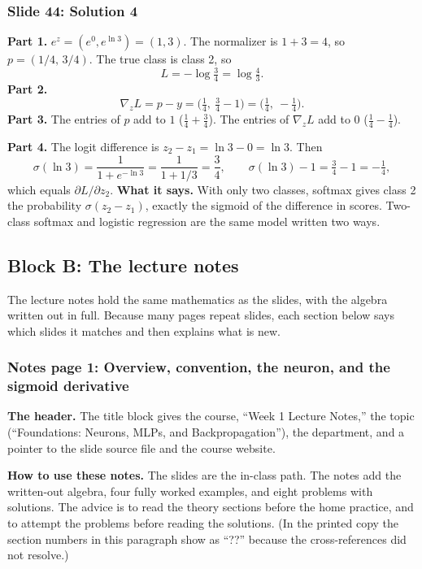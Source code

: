 \subsubsection{Slide 44: Solution 4}

\textbf{Part 1.} $e^{z}=(e^0,e^{\ln3})=(1,3)$. The normalizer is $1+3=4$, so $p=(1/4,\,3/4)$. The true class is class 2, so
\[
L=-\log\tfrac34=\log\tfrac43 .
\]
\textbf{Part 2.}
\[
\nabla_zL=p-y=\Big(\tfrac14,\ \tfrac34-1\Big)=\Big(\tfrac14,\ -\tfrac14\Big).
\]
\textbf{Part 3.} The entries of $p$ add to $1$ ($\tfrac14+\tfrac34$). The entries of $\nabla_zL$ add to $0$ ($\tfrac14-\tfrac14$).

\textbf{Part 4.} The logit difference is $z_2-z_1=\ln3-0=\ln3$. Then
\[
\sigma(\ln3)=\frac{1}{1+e^{-\ln3}}=\frac{1}{1+1/3}=\frac34, \qquad \sigma(\ln3)-1=\tfrac34-1=-\tfrac14 ,
\]
which equals $\partial L/\partial z_2$. \textbf{What it says.} With only two classes, softmax gives class 2 the probability $\sigma(z_2-z_1)$, exactly the sigmoid of the difference in scores. Two-class softmax and logistic regression are the same model written two ways.

\subsection{Block B: The lecture notes}

The lecture notes hold the same mathematics as the slides, with the algebra written out in full. Because many pages repeat slides, each section below says which slides it matches and then explains what is new.

\subsubsection{Notes page 1: Overview, convention, the neuron, and the sigmoid derivative}

\textbf{The header.} The title block gives the course, ``Week 1 Lecture Notes,'' the topic (``Foundations: Neurons, MLPs, and Backpropagation''), the department, and a pointer to the slide source file and the course website.

\textbf{How to use these notes.} The slides are the in-class path. The notes add the written-out algebra, four fully worked examples, and eight problems with solutions. The advice is to read the theory sections before the home practice, and to attempt the problems before reading the solutions. (In the printed copy the section numbers in this paragraph show as ``??'' because the cross-references did not resolve.)

